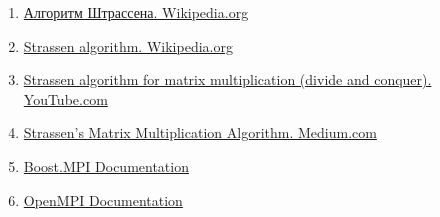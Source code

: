 \begin{enumerate}
    \item \href{https://ru.wikipedia.org/wiki/%D0%90%D0%BB%D0%B3%D0%BE%D1%80%D0%B8%D1%82%D0%BC_%D0%A8%D1%82%D1%80%D0%B0%D1%81%D1%81%D0%B5%D0%BD%D0%B0}{Алгоритм Штрассена. Wikipedia.org}
    \item \href{https://en.wikipedia.org/wiki/Strassen_algorithm}{Strassen algorithm. Wikipedia.org}
    \item \href{https://youtu.be/OSelhO6Qnlc?si=hPwljRSC7fxsv0gp}{Strassen algorithm for matrix multiplication (divide and conquer). YouTube.com}
    \item \href{https://medium.com/swlh/strassens-matrix-multiplication-algorithm-936f42c2b344}{Strassen’s Matrix Multiplication Algorithm. Medium.com}
    \item \href{https://www.boost.org/doc/libs/1_87_0/doc/html/mpi.html}{Boost.MPI Documentation}
    \item \href{https://www.open-mpi.org/doc/}{OpenMPI Documentation}
\end{enumerate}